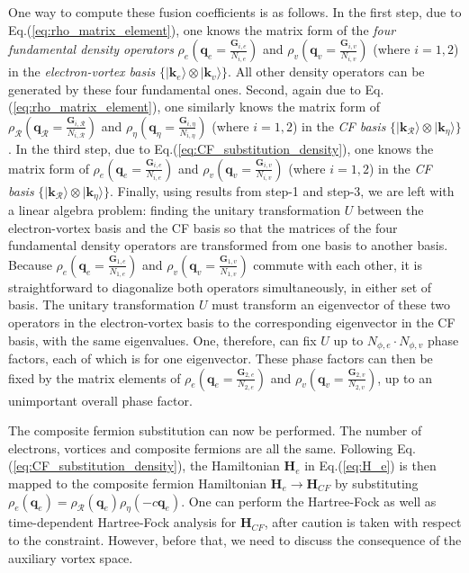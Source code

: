 One way to compute these fusion coefficients is as follows. In the first step, due to Eq.(\ref{eq:rho_matrix_element}), one knows the matrix form of the \emph{four fundamental density operators} $\rho_e(\mathbf q_e=\frac{\mathbf G_{i,e}}{N_{i,e}})$ and $\rho_v(\mathbf q_v=\frac{\mathbf G_{i,v}}{N_{i,v}})$ (where $i=1,2$) in the \emph{electron-vortex basis} $\{|\mathbf k_e\rangle\otimes |\mathbf k_v\rangle\}$. All other density operators can be generated by these four fundamental ones. Second, again due to Eq.(\ref{eq:rho_matrix_element}), one similarly knows the matrix form of $\rho_{\mathcal R}(\mathbf q_{\mathcal R}=\frac{\mathbf G_{i,\mathcal R}}{N_{i,\mathcal R}})$ and $\rho_\eta(\mathbf q_\eta=\frac{\mathbf G_{i,\eta}}{N_{i,\eta}})$ (where $i=1,2$) in the \emph{CF basis} $\{|\mathbf k_{\mathcal R}\rangle\otimes |\mathbf k_\eta\rangle\}$. In the third step, due to Eq.(\ref{eq:CF_substitution_density}), one knows the matrix form of $\rho_e(\mathbf q_e=\frac{\mathbf G_{i,e}}{N_{i,e}})$ and $\rho_v(\mathbf q_v=\frac{\mathbf G_{i,v}}{N_{i,v}})$ (where $i=1,2$) in the \emph{CF basis} $\{|\mathbf k_{\mathcal R}\rangle\otimes |\mathbf k_\eta\rangle\}$. Finally, using results from step-1 and step-3, we are left with a linear algebra problem: finding the unitary transformation $U$ between the electron-vortex basis and the CF basis so that the matrices of the four fundamental density operators are transformed from one basis to another basis. Because $\rho_e(\mathbf q_e=\frac{\mathbf G_{1,e}}{N_{1,e}})$ and $\rho_v(\mathbf q_v=\frac{\mathbf G_{1,v}}{N_{1,v}})$ commute with each other, it is straightforward to diagonalize both operators simultaneously, in either set of basis. The unitary transformation $U$ must transform an eigenvector of these two operators in the electron-vortex basis to the corresponding eigenvector in the CF basis, with the same eigenvalues. One, therefore, can fix $U$ up to $N_{\phi,e}\cdot N_{\phi,v}$ phase factors, each of which is for one eigenvector. These phase factors can then be fixed by the matrix elements of $\rho_e(\mathbf q_e=\frac{\mathbf G_{2,e}}{N_{2,e}})$ and $\rho_v(\mathbf q_v=\frac{\mathbf G_{2,v}}{N_{2,v}})$, up to an unimportant overall phase factor.

The composite fermion substitution can now be performed. The number of electrons, vortices and composite fermions are all the same. Following Eq.(\ref{eq:CF_substitution_density}), the Hamiltonian $\mathbf H_e$ in Eq.(\ref{eq:H_e}) is then mapped to the composite fermion Hamiltonian $\mathbf H_e\rightarrow \mathbf H_{CF}$ by substituting $\rho_e(\mathbf q_e)=\rho_{\mathcal R}(\mathbf q_e)\rho_{\eta}(-c\mathbf q_e)$. One can perform the Hartree-Fock as well as time-dependent Hartree-Fock analysis for $\mathbf H_{CF}$, after caution is taken with respect to the constraint. However, before that, we need to discuss the consequence of the auxiliary vortex space.

